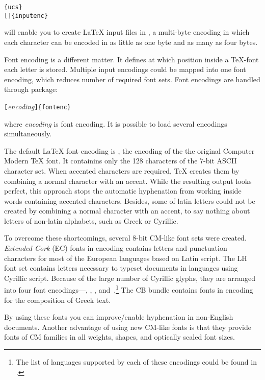 \begin{lscommand}
\verb|{ucs}|\\ 
\verb|[|\verb|]{inputenc}| 
\end{lscommand}
\noindent will enable you to create \LaTeX{} input files in 
, a multi-byte encoding in which each character can be encoded in
as little as one byte and as many as four bytes. 

Font encoding is a different matter. It defines at which position inside
a \TeX-font each letter is stored. Multiple input encodings could be mapped into 
one font encoding, which reduces number of required font sets.
Font encodings are handled through 
 package: \label{fontenc}
\begin{lscommand}
\verb|[|\emph{encoding}\verb|]{fontenc}| 
\end{lscommand}
\noindent where \emph{encoding} is font encoding. It is possible to load several
encodings simultaneously.

The default \LaTeX{} font encoding is \label{OT1} , the encoding of the
the  original Computer Modern \TeX{} font. It containins only the 128
characters of the 7-bit ASCII character set. When accented characters
are required, \TeX{} creates them by combining a normal character with
an accent. While the resulting output looks perfect, this approach stops
the automatic hyphenation from working inside words containing accented
characters. Besides, some of latin letters could not be created by
combining a normal character with an accent, to say nothing about letters of
non-latin alphabets, such as Greek or Cyrillic.

To overcome these shortcomings, several 8-bit CM-like font sets were created.
\emph{Extended Cork} (EC) fonts in  encoding contains 
letters and punctuation characters for most of the European
languages based on Latin script. The LH font set contains letters necessary
to typeset documents in languages using Cyrillic script. Because of the large
number of Cyrillic glyphs, they are arranged into four font
encodings---, , ,
and~.\footnote{The list of languages supported by each of these
encodings could be found in \cite{cyrguide}.} The CB bundle contains fonts
in  encoding for the composition of Greek text.

By using these fonts you can improve/enable hyphenation in non-English
documents. Another advantage of using new CM-like fonts is that they 
provide fonts of CM families in all weights, shapes, and optically
scaled font sizes. 

